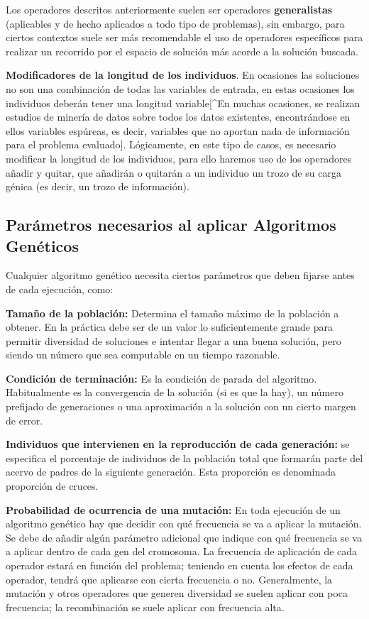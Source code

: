 \documentclass[
  a4paper,
  DIV=11,
  numbers=noendperiod]{scrreprt}
\begin{document}
Los operadores descritos anteriormente suelen ser operadores
\textbf{generalistas} (aplicables y de hecho aplicados a todo tipo de
problemas), sin embargo, para ciertos contextos suele ser más
recomendable el uso de operadores específicos para realizar un recorrido
por el espacio de solución más acorde a la solución buscada.

\textbf{Modificadores de la longitud de los individuos}. En ocasiones
las soluciones no son una combinación de todas las variables de entrada,
en estas ocasiones los individuos deberán tener una longitud
variable{[}\^{}En muchas ocasiones, se realizan estudios de minería de
datos sobre todos los datos existentes, encontrándose en ellos variables
espúreas, es decir, variables que no aportan nada de información para el
problema evaluado{]}. Lógicamente, en este tipo de casos, es necesario
modificar la longitud de los individuos, para ello haremos uso de los
operadores añadir y quitar, que añadirán o quitarán a un individuo un
trozo de su carga génica (es decir, un trozo de información).

\subsection{Parámetros necesarios al aplicar Algoritmos
Genéticos}\label{paruxe1metros-necesarios-al-aplicar-algoritmos-genuxe9ticos}

Cualquier algoritmo genético necesita ciertos parámetros que deben
fijarse antes de cada ejecución, como:

\textbf{Tamaño de la población:} Determina el tamaño máximo de la
población a obtener. En la práctica debe ser de un valor lo
suficientemente grande para permitir diversidad de soluciones e intentar
llegar a una buena solución, pero siendo un número que sea computable en
un tiempo razonable.

\textbf{Condición de terminación:} Es la condición de parada del
algoritmo. Habitualmente es la convergencia de la solución (si es que la
hay), un número prefijado de generaciones o una aproximación a la
solución con un cierto margen de error.

\textbf{Individuos que intervienen en la reproducción de cada
generación:} se especifica el porcentaje de individuos de la población
total que formarán parte del acervo de padres de la siguiente
generación. Esta proporción es denominada proporción de cruces.

\textbf{Probabilidad de ocurrencia de una mutación:} En toda ejecución
de un algoritmo genético hay que decidir con qué frecuencia se va a
aplicar la mutación. Se debe de añadir algún parámetro adicional que
indique con qué frecuencia se va a aplicar dentro de cada gen del
cromosoma. La frecuencia de aplicación de cada operador estará en
función del problema; teniendo en cuenta los efectos de cada operador,
tendrá que aplicarse con cierta frecuencia o no. Generalmente, la
mutación y otros operadores que generen diversidad se suelen aplicar con
poca frecuencia; la recombinación se suele aplicar con frecuencia alta.
\end{document}
